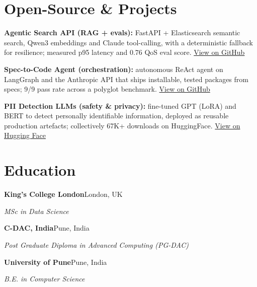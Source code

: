 \documentclass[10pt,a4paper]{article}
\begin{document}
\section{Open-Source \& Projects}
\begin{tight}
  \item \textbf{Agentic Search API (RAG + evals):} FastAPI + Elasticsearch semantic search, Qwen3 embeddings and Claude tool-calling, with a deterministic fallback for resilience; measured p95 latency and 0.76 QoS eval score. \href{https://github.com/abhijeetscode/search-agent}{View on GitHub}
  \item \textbf{Spec-to-Code Agent (orchestration):} autonomous ReAct agent on LangGraph and the Anthropic API that ships installable, tested packages from specs; 9/9 pass rate across a polyglot benchmark. \href{https://github.com/abhijeetscode/Spec-to-Code-Agent}{View on GitHub}
  \item \textbf{PII Detection LLMs (safety \& privacy):} fine-tuned GPT (LoRA) and BERT to detect personally identifiable information, deployed as reusable production artefacts; collectively 67K+ downloads on HuggingFace. \href{https://huggingface.co/ab-ai/pii_model}{View on Hugging Face}
\end{tight}

\section{Education}
{\color{company}\bfseries King's College London}\hfill {\color{muted}London, UK}\par
{\itshape MSc in Data Science}\par\vspace{2pt}
{\color{company}\bfseries C-DAC, India}\hfill {\color{muted}Pune, India}\par
{\itshape Post Graduate Diploma in Advanced Computing (PG-DAC)}\par\vspace{2pt}
{\color{company}\bfseries University of Pune}\hfill {\color{muted}Pune, India}\par
{\itshape B.E. in Computer Science}\par
\end{document}
